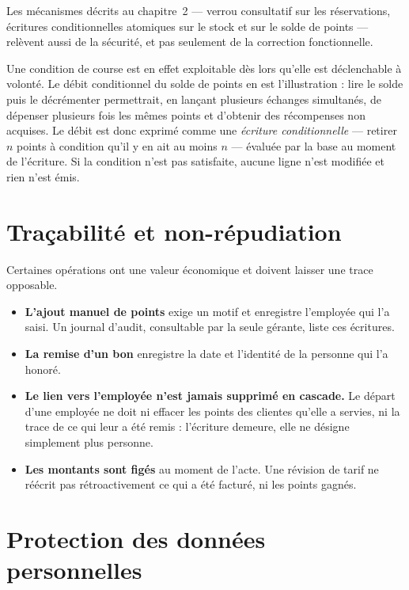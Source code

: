 Les mécanismes décrits au chapitre~2 --- verrou consultatif sur les
réservations, écritures conditionnelles atomiques sur le stock et sur le solde
de points --- relèvent aussi de la sécurité, et pas seulement de la
correction fonctionnelle.

Une condition de course est en effet exploitable dès lors qu'elle est
déclenchable à volonté. Le débit conditionnel du solde de points en est
l'illustration : lire le solde puis le décrémenter permettrait, en lançant
plusieurs échanges simultanés, de dépenser plusieurs fois les mêmes points et
d'obtenir des récompenses non acquises. Le débit est donc exprimé comme une
\emph{écriture conditionnelle} --- retirer $n$ points à condition qu'il y en ait
au moins $n$ --- évaluée par la base au moment de l'écriture. Si la condition
n'est pas satisfaite, aucune ligne n'est modifiée et rien n'est émis.

\section{Traçabilité et non-répudiation}

Certaines opérations ont une valeur économique et doivent laisser une trace
opposable.

\begin{itemize}[leftmargin=1.2cm]
  \item \textbf{L'ajout manuel de points} exige un motif et enregistre
  l'employée qui l'a saisi. Un journal d'audit, consultable par la seule
  gérante, liste ces écritures.

  \item \textbf{La remise d'un bon} enregistre la date et l'identité de la
  personne qui l'a honoré.

  \item \textbf{Le lien vers l'employée n'est jamais supprimé en cascade.} Le
  départ d'une employée ne doit ni effacer les points des clientes qu'elle a
  servies, ni la trace de ce qui leur a été remis : l'écriture demeure, elle ne
  désigne simplement plus personne.

  \item \textbf{Les montants sont figés} au moment de l'acte. Une révision de
  tarif ne réécrit pas rétroactivement ce qui a été facturé, ni les points
  gagnés.
\end{itemize}

\section{Protection des données personnelles}

